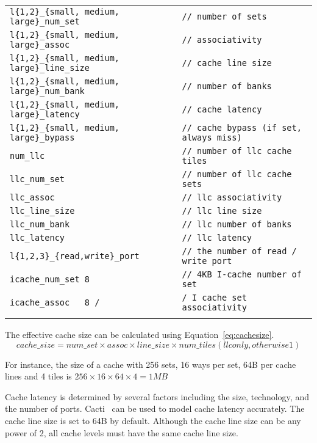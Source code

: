 \begin{tabular}{l l}
 \\
 \Verb+l{1,2}_{small, medium, large}_num_set+ & \Verb+// number of sets+ \\
 \Verb+l{1,2}_{small, medium, large}_assoc+ & \Verb+// associativity+ \\
 \Verb+l{1,2}_{small, medium, large}_line_size+ & \Verb+// cache line size+ \\
 \Verb+l{1,2}_{small, medium, large}_num_bank+ & \Verb+// number of banks+ \\
 \Verb+l{1,2}_{small, medium, large}_latency + & \Verb+// cache latency+ \\
 \Verb+l{1,2}_{small, medium, large}_bypass + & \Verb+// cache bypass (if set, always miss)+ \\
 \Verb+num_llc + & \Verb+// number of llc cache tiles+ \\
 \Verb+llc_num_set + & \Verb+// number of llc cache sets+ \\
 \Verb+llc_assoc + & \Verb+// llc associativity+ \\
 \Verb+llc_line_size+ & \Verb+// llc line size+ \\
 \Verb+llc_num_bank+ & \Verb+// llc number of banks+ \\
 \Verb+llc_latency + & \Verb+// llc latency+ \\
 \Verb+l{1,2,3}_{read,write}_port + & \Verb+// the number of read / write port+ \\
 \Verb+icache_num_set 8 + & \Verb+// 4KB I-cache number of set+ \\
 \Verb+icache_assoc   8 /+ & \Verb+/ I cache set associativity + \\
 \\
\end{tabular}

\noindent The effective cache size can be calculated using Equation~\ref{eq:cachesize}.
\begin{equation}
\label{eq:cachesize}
cache\_size = num\_set \times assoc \times line\_size \times num\_tiles (llc only, otherwise 1)
\end{equation}


\noindent For instance, the size of a cache with 256 sets, 16 ways per set, 64B per cache lines and 4
tiles is $256 \times 16 \times 64 \times 4 = 1\textit{MB}$

Cache latency is determined by several factors including the
size, technology, and the number of ports. Cacti~\cite{cacti} can be
used to model cache latency accurately. The cache line size is set to
64B by default. Although the cache line size can be any power of 2,
all cache levels must have the same cache line size.


